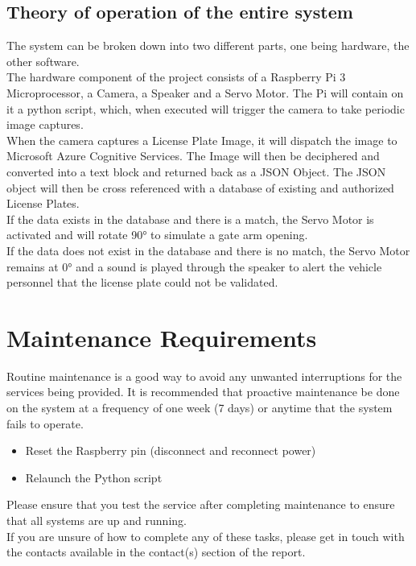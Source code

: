 \documentclass[a4paper,12pt]{article}
\begin{document}
\subsection{Theory of operation of the entire system}
The system can be broken down into two different parts, one being hardware, the other software. \\
The hardware component of the project consists of a Raspberry Pi 3 Microprocessor, a Camera, a Speaker and a Servo Motor. The Pi will contain on it a python script, which, when executed will trigger the camera to take periodic image captures. \\
When the camera captures a License Plate Image, it will dispatch the image to Microsoft Azure Cognitive Services. The Image will then be deciphered and converted into a text block and returned back as a JSON Object. The JSON object will then be cross referenced with a database of existing and authorized License Plates.\\
If the data exists in the database and there is a match, the Servo Motor is activated and will rotate \ang{90} to simulate a gate arm opening.\\
If the data does not exist in the database and there is no match, the Servo Motor remains at \ang{0} and a sound is played through the speaker to alert the vehicle personnel that the license plate could not be validated. 
\newpage
\section{Maintenance Requirements}
Routine maintenance is a good way to avoid any unwanted interruptions for the services being provided. It is recommended that proactive maintenance be done on the system at a frequency of one week (7 days) or anytime that the system fails to operate.
\begin{itemize}
    \item Reset the Raspberry pin (disconnect and reconnect power)
    \item Relaunch the Python script
\end{itemize}
Please ensure that you test the service after completing maintenance to ensure that all systems are up and running. \\
If you are unsure of how to complete any of these tasks, please get in touch with the contacts available in the contact(s) section of the report.

\appendix
\end{document}
